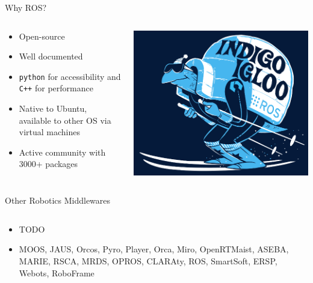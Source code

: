 \documentclass[aspectratio=43]{beamer}
\begin{document}
\begin{frame}{Why ROS?}
\begin{columns}
	\begin{column}{0.55\textwidth}
		\begin{itemize}
			\item Open-source
			\item Well documented
			\item \alert{\texttt{python}} for accessibility and \alert{\texttt{C++}} for performance 
			\item Native to \alert{Ubuntu}, available to other OS via virtual machines
			\item Active community with \alert{3000+} packages
		\end{itemize}
	\end{column}
	\begin{column}{0.45\textwidth}
		\centering
		\includegraphics[width=\textwidth]{fig/indigoigloo_600.png}
	\end{column}
\end{columns}

\end{frame}


\begin{frame}{Other Robotics Middlewares}
	\begin{columns}
		\begin{column}{0.6\textwidth}
			\begin{itemize}
				\item TODO
				\item MOOS, JAUS, Orcos, Pyro, Player, Orca, Miro, OpenRTMaist, ASEBA, MARIE, RSCA, MRDS, OPROS, CLARAty, ROS, SmartSoft, ERSP, Webots, RoboFrame
			\end{itemize}
		\end{column}
		\begin{column}{0.4\textwidth}
			\centering
		\end{column}
	\end{columns}
\end{frame}
\end{document}
